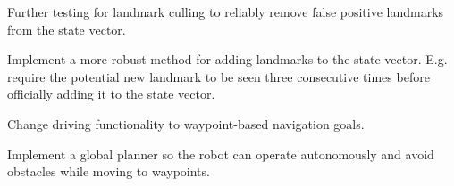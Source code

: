 \begin{DoxyItemize}
\item Further testing for landmark culling to reliably remove false positive landmarks from the state vector.
\item Implement a more robust method for adding landmarks to the state vector. E.\+g. require the potential new landmark to be seen three consecutive times before officially adding it to the state vector.
\item Change driving functionality to waypoint-\/based navigation goals.
\item Implement a global planner so the robot can operate autonomously and avoid obstacles while moving to waypoints. 
\end{DoxyItemize}